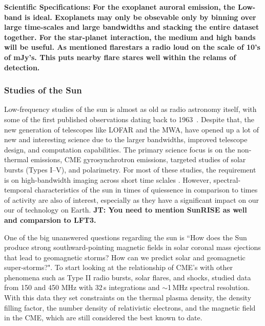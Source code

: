 \textbf{Scientific Specifications:} \textbf{For the exoplanet auroral emission, the Low-band is ideal. Exoplanets may only be obsevable only by binning over large time-scales and large bandwidths and stacking the entire dataset together. For the star-planet interaction, the medium and high bands will be useful. As mentioned flarestars a radio loud on the scale of 10's of mJy's. This puts nearby flare stares well within the relams of detection. } 





\subsubsection{Studies of the Sun}
Low-frequency studies of the sun is almost as old as radio astronomy itself, with some of the first published observations dating back to 1963~\citep{Wild_1963}. Despite that, the new generation of telescopes like LOFAR and the MWA, have opened up a lot of new and interesting science due to the larger bandwidths, improved telescope design, and computation capabilities. The primary science focus is on the non-thermal emissions, CME gyrosynchrotron emissions, targeted studies of solar bursts (Types I--V), and polarimetry. For most of these studies, the requirement is on high-bandwidth imaging across short time sclales \citep{Kansabanik_2022}. However, spectral-temporal characteristics of the sun in times of quiessence in comparison to times of activity are also of interest, especially as they have a significant impact on our our of technology on Earth.
\textbf{JT: You need to mention SunRISE as well and comparsion to LFT3.}

One of the big unanswered questions regarding the sun is ``How does the Sun produce strong southward-pointing magnetic fields in solar coronal mass ejections that lead to geomagnetic storms? How can we predict solar and geomagnetic super-storms?". To start looking at the relationship of CME's with other phenomena such as Type II radio bursts, solar flares, and shocks, \cite{Bastian_2001} studied data from 150 and 450 MHz with 32\,s integrations and $\sim$1\,MHz spectral resolution. With this data they set constraints on the thermal plasma density, the density filling factor, the number density of relativistic electrons, and the magnetic field in the CME, which are still considered the best known to date.

